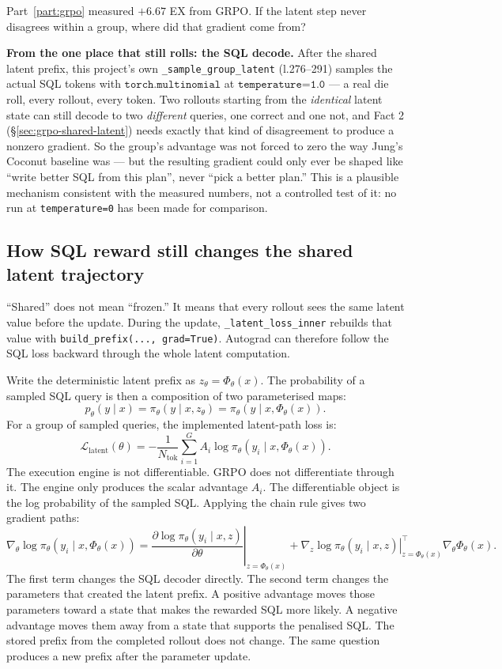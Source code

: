 \documentclass[11pt]{article}
\theoremstyle{definition}
\begin{document}
Part~\ref{part:grpo} measured $+6.67$ EX from GRPO. If the latent step never disagrees within a group, where did that gradient come from?

\textbf{From the one place that still rolls: the SQL decode.} After the shared latent prefix, this project's own \texttt{\_sample\_group\_latent} (l.276--291) samples the actual SQL tokens with $\texttt{torch.multinomial}$ at $\texttt{temperature=1.0}$ --- a real die roll, every rollout, every token. Two rollouts starting from the \emph{identical} latent state can still decode to two \emph{different} queries, one correct and one not, and Fact 2 (\S\ref{sec:grpo-shared-latent}) needs exactly that kind of disagreement to produce a nonzero gradient. So the group's advantage was not forced to zero the way Jung's Coconut baseline was --- but the resulting gradient could only ever be shaped like ``write better SQL from this plan'', never ``pick a better plan.'' This is a plausible mechanism consistent with the measured numbers, not a controlled test of it: no run at \texttt{temperature=0} has been made for comparison.

\subsection{How SQL reward still changes the shared latent trajectory}
\label{sec:shared-latent-chain-rule}

``Shared'' does not mean ``frozen.'' It means that every rollout sees the same latent value before the update. During the update, \texttt{\_latent\_loss\_inner} rebuilds that value with \texttt{build\_prefix(..., grad=True)}. Autograd can therefore follow the SQL loss backward through the whole latent computation.

Write the deterministic latent prefix as $z_\theta=\Phi_\theta(x)$. The probability of a sampled SQL query is then a composition of two parameterised maps:
\[
p_\theta(y\mid x)=\pi_\theta\!\left(y\mid x,z_\theta\right)
=\pi_\theta\!\left(y\mid x,\Phi_\theta(x)\right).
\]
For a group of sampled queries, the implemented latent-path loss is:
\[
\mathcal L_{\mathrm{latent}}(\theta)
=-\frac{1}{N_{\mathrm{tok}}}\sum_{i=1}^{G}A_i
\log\pi_\theta\!\left(y_i\mid x,\Phi_\theta(x)\right).
\tag{10.4}
\]
The execution engine is not differentiable. GRPO does not differentiate through it. The engine only produces the scalar advantage $A_i$. The differentiable object is the log probability of the sampled SQL. Applying the chain rule gives two gradient paths:
\[
\nabla_\theta\log\pi_\theta(y_i\mid x,\Phi_\theta(x))
=
\left.\frac{\partial\log\pi_\theta(y_i\mid x,z)}{\partial\theta}\right|_{z=\Phi_\theta(x)}
+
\left.\nabla_z\log\pi_\theta(y_i\mid x,z)\right|_{z=\Phi_\theta(x)}^{\!\top}
\nabla_\theta\Phi_\theta(x).
\tag{10.5}
\]
The first term changes the SQL decoder directly. The second term changes the parameters that created the latent prefix. A positive advantage moves those parameters toward a state that makes the rewarded SQL more likely. A negative advantage moves them away from a state that supports the penalised SQL. The stored prefix from the completed rollout does not change. The same question produces a new prefix after the parameter update.
\end{document}
